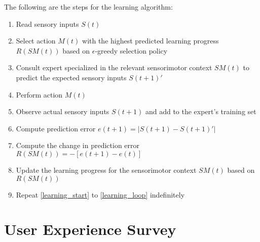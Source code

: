 The following are the steps for the learning algorithm:

\begin{enumerate}
	\item \label{learning_start} Read sensory inputs $S(t)$
	\item Select action $M(t)$ with the highest predicted learning progress $R(SM(t))$ based on $\epsilon$-greedy selection policy
	\item Consult expert specialized in the relevant sensorimotor context $SM(t)$ to predict the expected sensory inputs $S(t+1)'$
	\item Perform action $M(t)$
	\item Observe actual sensory inputs $S(t+1)$ and add to the expert's training set
	\item Compute prediction error $e(t+1) = |S(t+1) - S(t+1)'|$
	\item Compute the change in prediction error $R(SM(t)) = -[e(t+1) - e(t)]$
	\item Update the learning progress for the sensorimotor context $SM(t)$ based on $R(SM(t))$
	\item \label{learning_loop} Repeat \ref{learning_start} to \ref{learning_loop} indefinitely
\end{enumerate}



\section{User Experience Survey}
